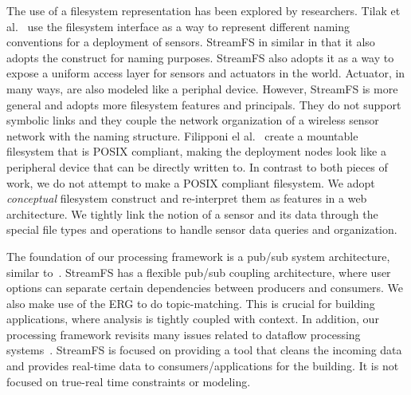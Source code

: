 The use of a filesystem representation has been explored by researchers.  Tilak et al.~\cite{BingFS} use the filesystem 
interface as a way to represent different naming conventions for a deployment of sensors.	StreamFS in similar in that it also 
adopts the construct for naming purposes.  StreamFS also adopts it as a way to expose a uniform access layer for sensors and
actuators in the world.  Actuator, in many ways, are also modeled like a periphal device.
However, StreamFS is more general and adopts more filesystem features and principals.
They do not support symbolic links and they couple the network organization of a wireless sensor network with the naming structure.
Filipponi el al.~\cite{wsnfuse} create a mountable filesystem that is POSIX compliant, making the deployment nodes
look like a peripheral device that can be directly written to.  In contrast to both pieces of work, we do not attempt
to make a POSIX compliant filesystem.  We adopt \emph{conceptual} filesystem construct and re-interpret them as features in 
a web architecture.  We tightly link the notion of a sensor and its data through the special file types and operations to 
handle sensor data queries and organization.




The foundation of our processing framework is a pub/sub system architecture, similar 
to~\cite{Eugster01contentbasedpubsub, Rosenblum97adesign, tspaces, tibco}.  StreamFS has a flexible pub/sub coupling architecture,
where user options can separate certain dependencies between producers and consumers.  We also make use of the ERG to 
do topic-matching.  This is crucial for building applications, where analysis is tightly coupled with context.
In addition, our processing framework revisits many issues related to dataflow processing systems~\cite{CullerCSD92716,ptolemy2001,ptolemy2007}.
StreamFS is focused on providing a tool that cleans the incoming data and provides real-time data to consumers/applications
for the building.  It is not focused on true-real time constraints or modeling.











